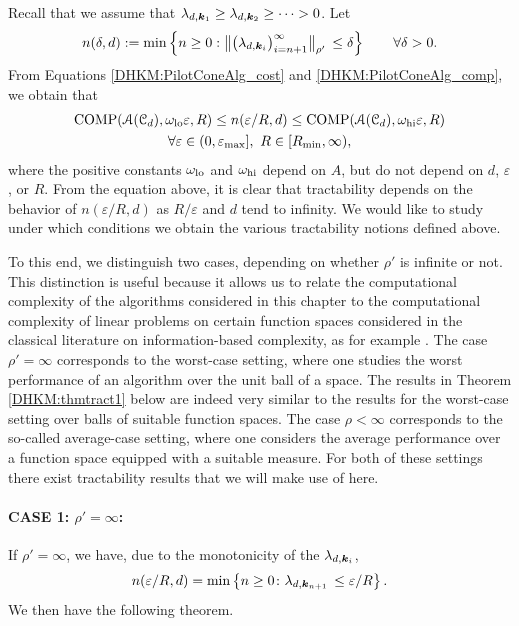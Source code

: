 \documentclass[USenglish]{article}
\theoremstyle{dgthm}
\theoremstyle{dgthm}
\theoremstyle{dgthm}
\theoremstyle{dgthm}
\theoremstyle{dgdef}
\theoremstyle{definition}
\DeclareMathOperator{\COMP}{COMP}
\newcommand{\bignorm}[2][{}]{\ensuremath{\bigl \lVert #2 \bigr \rVert}_{#1}}
\begin{document}
Recall that we assume that 
$\lambda_{d,{\boldsymbol{k}}_1}\geq \lambda_{d,{\boldsymbol{k}}_2}\geq \cdots >0$. Let 
\[
n(\delta,d) :=\min \left \{n\ge 0: \bignorm[\rho']{\bigl(  \lambda_{d,\bsk_i}  \bigr)_{i = n+1}^{\infty}} \,
    \le \delta \right \} \qquad \forall \delta > 0.
\]
From 
Equations \eqref{DHKM:PilotConeAlg_cost} and \eqref{DHKM:PilotConeAlg_comp}, we obtain that 
\begin{multline*}
     \COMP(\calA(\calC_d),\omega_{\textup{lo}} \varepsilon,R) \le n(\varepsilon/R,d) \le 
        \COMP(\calA(\calC_d),\omega_{\textup{hi}} \varepsilon,R)  \\
        \forall \varepsilon \in (0, \varepsilon_{\max}], \ R \in [R_{\min}, \infty),
\end{multline*}
where the positive constants $\omega_{\textup{lo}}$ and $\omega_{\textup{hi}}$  depend on $A$, but do not depend on $d$, $\varepsilon$, or $R$.  From the equation above, it is clear that tractability depends on the behavior of $n(\varepsilon/R,d)$ as $R/\varepsilon$ and $d$ tend to infinity. We would like to study under which conditions we obtain the various tractability notions defined above.

To this end, we distinguish two cases, depending on whether $\rho'$ is infinite or not. This 
distinction is useful because it allows us to relate the computational complexity of the algorithms 
considered in this chapter to the computational complexity of linear problems on certain function spaces considered in the classical literature on information-based complexity, as for example \cite{NovWoz08a}. The case $\rho'=\infty$ corresponds to the
worst-case setting, where one studies the worst performance of an algorithm over the unit ball of 
a space. The results in Theorem \ref{DHKM:thmtract1} below are indeed very similar to the results 
for the worst-case setting over balls of suitable function spaces. The case $\rho<\infty$ corresponds to the so-called average-case setting, where one 
considers the average performance over a function space equipped with a suitable measure. 
For both of these settings there exist tractability results that we will make use of here.



\paragraph*{CASE 1: $\rho'=\infty$:}

If $\rho'=\infty$, we have, due to the monotonicity of the $\lambda_{d,{\boldsymbol{k}}_i}$, 
\[
n(\varepsilon/R,d)=\min \left \{n\geq 0\colon \lambda_{d,{\boldsymbol{k}}_{n+1}} \,
    \leq \varepsilon/R \right \}.
\]
We then have the following theorem.
\end{document}
